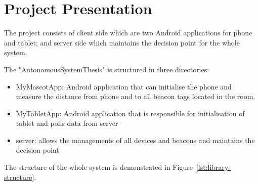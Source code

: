 \section{Project Presentation}
\label{sec:project-presentation}
The project consists of client side which are two Android applications for phone and tablet;
and server side which maintains the decision point for the whole system.

The "AutonomousSystemThesis" is structured in three directories:

\begin{itemize}
    \item MyMascotApp: Android application that can initialise the phone and measure the distance
            from phone and to all beacon tags located in the room.
    \item MyTabletApp: Android application that is responsible for initialisation of tablet and polls data from server
    \item server: allows the managements of all devices and beacons and maintains the decision point
\end{itemize}

The structure of the whole system is demonstrated in Figure~\ref{lst:library-structure}.

